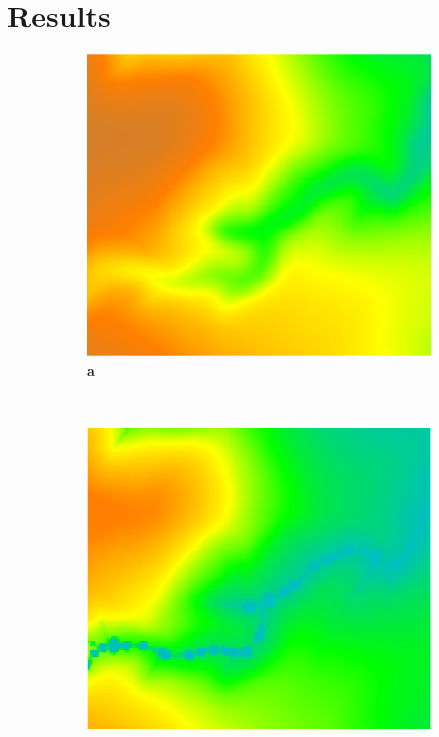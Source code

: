 \documentclass[10pt,letterpaper]{article}
\begin{document}
\section*{Results}

\begin{figure}
\centering
%   
\begin{subfigure}[b]{0.3\textwidth}
\includegraphics[width=\textwidth]{images/lrwoods_elevation.png}
\label{fig_1_1}
\textbf{a} \\
\end{subfigure}
%
~ %
%
\begin{subfigure}[b]{0.3\textwidth}
\includegraphics[width=\textwidth]{images/lrwoods_dynamics_flux_5m_30m.png}

\end{subfigure}
\end{figure}
\end{document}
